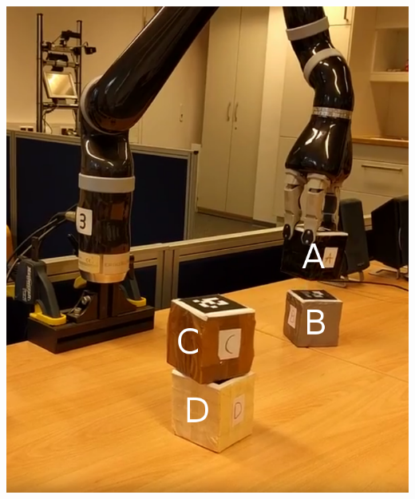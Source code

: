\begin{frame}
\begin{columns}
\begin{column}{0.4\textwidth}
    \includegraphics[width=\textwidth]{../thesis/img/blocks-world-annotated}
    \end{column}
  \end{columns}
\end{frame}


